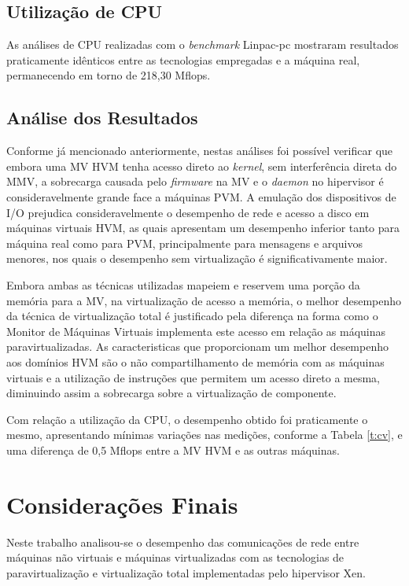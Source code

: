 \documentclass[times, 10pt,twocolumn]{article}
\def\kernel{\textit{kernel}\xspace}
\def\hpv{hipervisor\xspace}
\def\mmv{{Monitor de Máquinas Virtuais}\xspace}
\begin{document}
\subsection{Utilização de CPU}
As análises de CPU realizadas com o \textit{benchmark} Linpac-pc mostraram
resultados praticamente idênticos entre as tecnologias empregadas e a máquina
real, permanecendo em torno de 218,30 Mflops.

\subsection{Análise dos Resultados} 
Conforme já mencionado anteriormente, nestas análises foi possível verificar 
que embora uma MV HVM tenha acesso direto ao \kernel, sem interferência direta 
do MMV, a sobrecarga causada pelo \textit{firmware} na MV e o \textit{daemon}
no \hpv é consideravelmente grande face a máquinas PVM. A emulação dos dispositivos
de I/O prejudica consideravelmente o desempenho de rede e acesso a disco em 
máquinas virtuais HVM, as quais apresentam um desempenho inferior tanto para 
máquina real como para PVM, principalmente para mensagens e arquivos menores, 
nos quais o desempenho sem virtualização é significativamente maior.

Embora ambas as técnicas utilizadas mapeiem e reservem uma porção da memória para a 
MV, na virtualização de acesso a memória, o melhor desempenho da técnica de 
virtualização total é justificado pela diferença na forma como o \mmv implementa 
este acesso em relação as máquinas paravirtualizadas. As caracteristicas que 
proporcionam um melhor desempenho aos domínios HVM são o não compartilhamento de 
memória com as máquinas virtuais e a utilização de instruções que permitem um acesso
direto a mesma, diminuindo assim a sobrecarga sobre a virtualização de componente.

Com relação a utilização da CPU, o desempenho obtido foi praticamente o mesmo, 
apresentando mínimas variações nas medições, conforme a Tabela \ref{t:cv},
e uma diferença de 0,5 Mflops entre a MV HVM e as outras máquinas.


\section{Considerações Finais}\label{s:fim}
Neste trabalho analisou-se o desempenho das comunicações de rede entre máquinas não
virtuais e máquinas virtualizadas com as tecnologias de paravirtualização e 
virtualização total implementadas pelo \hpv Xen. 
\end{document}
